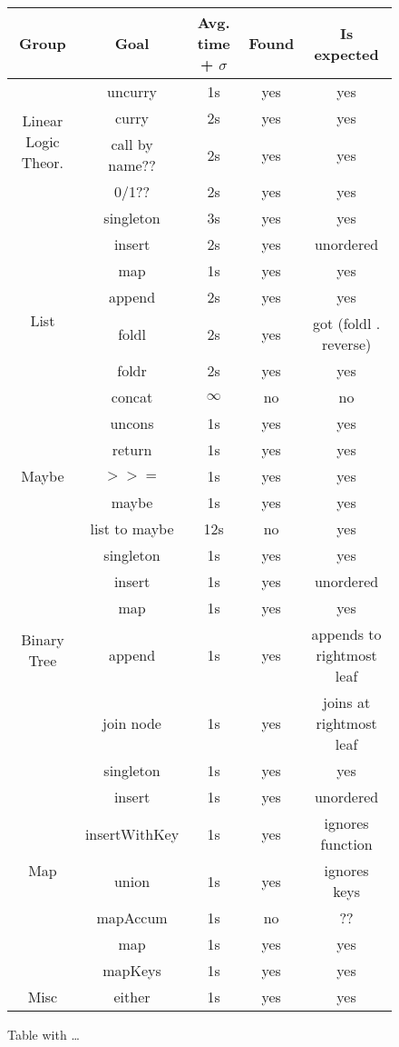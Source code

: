 \documentclass{llncs}
\begin{document}
\begin{figure}[t]
{\scriptsize
\begin{center}
    \begin{tabular}{ |c|c|c|c|c| }
        \hline
        Group & Goal & Avg. time + $\sigma$ & Found & Is expected \\
        \hline
        \multirow{4}{4em}{Linear Logic Theor.} & uncurry & 1s & yes & yes \\ 
        & curry & 2s & yes & yes \\ 
        & call by name?? & 2s & yes & yes \\ 
        & 0/1?? & 2s & yes & yes \\ 
        \hline
        \multirow{8}{4em}{List} & singleton & 3s & yes & yes \\ 
        & insert & 2s & yes & unordered \\ 
        & map & 1s & yes & yes \\ 
        & append & 2s & yes & yes \\ 
        & foldl & 2s & yes & got (foldl . reverse) \\ 
        & foldr & 2s & yes & yes \\ 
        & concat & $\infty$ & no & no \\ 
        & uncons & 1s & yes & yes \\
        \hline
        \multirow{3}{4em}{Maybe} & return & 1s & yes & yes \\ 
        & $>>=$ & 1s & yes & yes \\
        & maybe & 1s & yes & yes \\
        & list to maybe & 12s & no & yes \\
        \hline
        \multirow{5}{4em}{Binary Tree} & singleton & 1s & yes & yes \\ 
        & insert & 1s & yes & unordered \\
        & map & 1s & yes & yes \\
        & append & 1s & yes & appends to rightmost leaf \\
        & join node & 1s & yes & joins at rightmost leaf \\
        \hline
        \multirow{7}{4em}{Map} & singleton & 1s & yes & yes \\ 
        & insert & 1s & yes & unordered \\
        & insertWithKey & 1s & yes & ignores function \\
        & union & 1s & yes & ignores keys \\
        & mapAccum & 1s & no & ?? \\
        & map & 1s & yes & yes \\
        & mapKeys & 1s & yes & yes \\
        \hline
        \multirow{1}{4em}{Misc} & either & 1s & yes & yes \\ 
        \hline
    \end{tabular}
  \end{center}
}
\caption{Table with \dots}
\end{figure}
\end{document}
